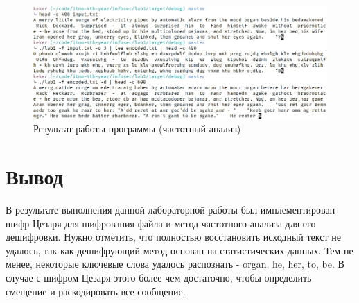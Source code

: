 \documentclass[12pt, a4paper]{article}
\begin{document}
\begin{figure}[H]
  \includegraphics[scale = 0.55]{res2}
  \caption{Результат работы программы (частотный анализ)}
  \centering
\end{figure}

\section*{Вывод}

В результате выполнения данной лабораторной работы был имплементирован
шифр Цезаря для шифрования файла и метод частотного анализа для его
дешифровки. Нужно отметить, что полностью восстановить исходный текст
не удалось, так как дешифрующий метод основан на статистических данных.
Тем не менее, некоторые ключевые слова удалось распознать - organ, he,
her, to, be. В случае с шифром Цезаря этого более чем достаточно, чтобы
определить смещение и раскодировать все сообщение.
\end{document}
